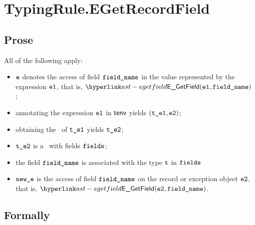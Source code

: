 \section{TypingRule.EGetRecordField \label{sec:TypingRule.EGetRecordField}}
\subsection{Prose}
All of the following apply:
\begin{itemize}
  \item $\ve$ denotes the access of field $\fieldname$ in the value represented by the expression $\veone$, that is, $\EGetField(\veone, \fieldname)$;
  \item annotating the expression $\veone$ in $\tenv$ yields $(\vteone, \vetwo)$\ProseOrTypeError;
  \item obtaining the \underlyingtype\ of $\vteone$ yields $\vtetwo$\ProseOrTypeError;
  \item $\vtetwo$ is a \structuredtype\ with fields $\fields$;
  \item the field $\fieldname$ is associated with the type $\vt$ in $\fields$
  \item $\newe$ is the access of field $\fieldname$ on the record or exception object $\vetwo$, that is, $\EGetField(\vetwo, \fieldname)$.
\end{itemize}



\subsection{Formally}
\begin{mathpar}
\end{mathpar}


